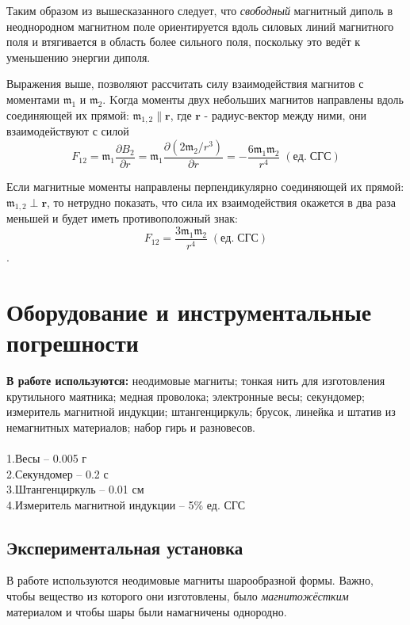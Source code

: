 \documentclass[a4paper,12pt]{article}
\begin{document}
Таким образом из вышесказанного следует, что \textit{свободный} магнитный диполь в неоднородном магнитном поле ориентируется вдоль силовых линий магнитного поля и втягивается в область более сильного поля, поскольку это ведёт к уменьшению энергии диполя.

Выражения выше, позволяют рассчитать силу взаимодействия магнитов с моментами $\mathfrak{m_1}$ и $\mathfrak{m_2}$. Kогда моменты двух небольших магнитов направлены вдоль соединяющей их прямой: $\mathfrak{m_{1,2}} \| \textbf{r}$, где $\textbf{r}$ - радиус-вектор между ними, они взаимодействуют с силой
\[F_{12}= \mathfrak{m_1} \frac{\partial{B_2}}{\partial{r}} = \mathfrak{m_1}\frac{\partial{(2\mathfrak{m_2}/r^3)}}{\partial{r}} = -\frac{6 \mathfrak{m_1}\mathfrak{m_2}}{r^4} \;(ед.\; СГС) \]


Если магнитные моменты направлены перпендикулярно соединяющей их прямой: $\mathfrak{m_{1,2}} \perp \textbf{r}$, то нетрудно показать, что сила их взаимодействия окажется в два раза меньшей и будет иметь противоположный знак: $$F_{12} = \frac{3\mathfrak{m_1} \mathfrak{m_2}}{r^4}\;(ед.\; СГС) $$.




\section{Оборудование и инструментальные погрешности}

\noindent \textbf{В работе используются:} неодимовые магниты; тонкая нить для изготовления крутильного маятника; медная проволока; электронные весы; секундомер; измеритель магнитной индукции; штангенциркуль; брусок, линейка и штатив из немагнитных материалов; набор гирь и разновесов.\\
\\
1.Весы -- 0.005 г \\
2.Секундомер -- 0.2 с \\
3.Штангенциркуль -- 0.01 см \\
4.Измеритель магнитной индукции -- 5\% ед. СГС \\


 \subsection{Экспериментальная установка}

В работе используются неодимовые магниты шарообразной формы. Важно, чтобы вещество из которого они изготовлены, было \textit{магнитожёстким} материалом и чтобы шары были намагничены однородно.
\end{document}
